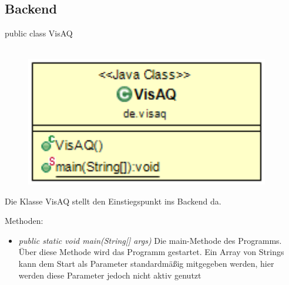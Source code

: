 \subsection{Backend}
public class VisAQ
\\\\
\begin{minipage}{0.3\textwidth}
    \begin{figure}[H]
        {\centering\includegraphics[width=0.95\textwidth]{media/backend/classes/VisAQ.png}}
    \end{figure}
    \end{minipage} \hfill
\begin{minipage}{0.7\textwidth}
    Die Klasse VisAQ stellt den Einstiegspunkt ins Backend da.
\end{minipage}

Methoden:
\begin{itemize}
    \item \emph{public static void main(String[] args)} Die main-Methode des Programms.
    Über diese Methode wird das Programm gestartet. Ein Array von Strings kann dem Start als Parameter standardmäßig mitgegeben werden, hier werden diese Parameter jedoch nicht aktiv genutzt
\end{itemize}


